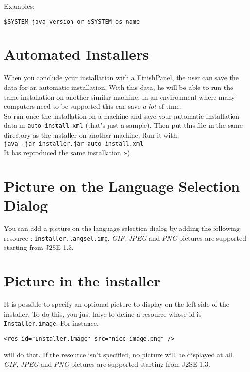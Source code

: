 Examples:
\begin{verbatim}
$SYSTEM_java_version or $SYSTEM_os_name
\end{verbatim}

\section{Automated Installers}

When you conclude your installation with a FinishPanel, the user can
save the data for an automatic installation. With this data, he will be
able to run the same installation on another similar machine. In an
environment where many computers need to be supported this can save
\textsl{a lot} of time.\\

So run once the installation on a machine and save your automatic installation
data in \texttt{auto-install.xml} (that's just a sample). Then put this file in
the same directory as the installer on another machine. Run it with:\\
\texttt{java -jar installer.jar auto-install.xml}\\

It has reproduced the same installation :-)\\

\section{Picture on the Language Selection Dialog}

You can add a picture on the language selection dialog by adding the following
resource : \texttt{installer.langsel.img}. \textsl{GIF}, \textsl{JPEG} and
\textsl{PNG} pictures are supported starting from J2SE 1.3.\\

\section{Picture in the installer}

It is possible to specify an optional picture to display on the left side of the
installer. To do this, you just have to define a resource whose id is
\texttt{Installer.image}. For instance,
\begin{verbatim}
<res id="Installer.image" src="nice-image.png" />
\end{verbatim}
will do that. If the resource isn't specified, no picture will be displayed at
all. \textsl{GIF}, \textsl{JPEG} and
\textsl{PNG} pictures are supported starting from J2SE 1.3.\\

